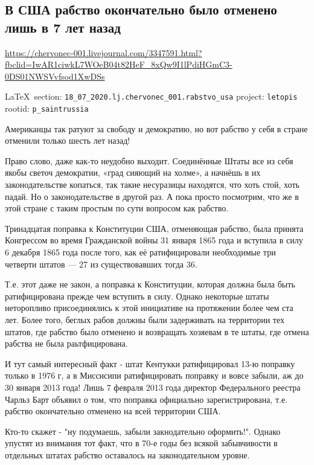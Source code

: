  
 
\subsection{В США рабство окончательно было отменено лишь в 7 лет назад}
\url{https://chervonec-001.livejournal.com/3347591.html?fbclid=IwAR1ciwkL7WOeB04t82HeF_8xQw9I1lPdiHGmC3-0DS01NWSVvfsod1XwDSs}
  
\vspace{0.5cm}
{\small\LaTeX~section: \verb|18_07_2020.lj.chervonec_001.rabstvo_usa| project: \verb|letopis| rootid: \verb|p_saintrussia|}
\vspace{0.5cm}

Американцы так ратуют за свободу и демократию, но вот рабство у себя в стране
отменили только шесть лет назад!

Право слово, даже как-то неудобно выходит. Соединённые Штаты все из себя якобы
светоч демократии, «град сияющий на холме», а начнёшь в их законодательстве
копаться, так такие несуразицы находятся, что хоть стой, хоть падай. Но о
законодательстве в другой раз. А пока просто посмотрим, что же в этой стране с
таким простым по сути вопросом как рабство.

Тринадцатая поправка к Конституции США, отменяющая рабство, была принята
Конгрессом во время Гражданской войны 31 января 1865 года и вступила в силу 6
декабря 1865 года после того, как её ратифицировали необходимые три четверти
штатов — 27 из существовавших тогда 36.

Т.е. этот даже не закон, а поправка к Конституции, которая должна была быть
ратифицирована прежде чем вступить в силу. Однако некоторые штаты неторопливо
присоединялись к этой инициативе на протяжении более чем ста лет. Более того,
беглых рабов должны были задерживать на территории тех штатов, где рабство было
отменено и возвращать хозяевам в те штаты, где отмена рабства не была
раьтфицирована.

И тут самый интересный факт - штат Кентукки ратифицировал 13-ю поправку только
в 1976 г, а в Миссисипи ратифицировать поправку и вовсе забыли, аж до 30 января
2013 года! Лишь 7 февраля 2013 года директор Федерального реестра Чарльз Барт
объявил о том, что поправка официально зарегистрирована, т.е. рабство
окончательно отменено на всей территории США.

Кто-то скажет - "ну подумаешь, забыли закнодательно оформить!". Однако упустят
из внимания тот факт, что в 70-е годы без всякой забывчивости в отдельных
штатах рабство оставалось на законодательном уровне.


